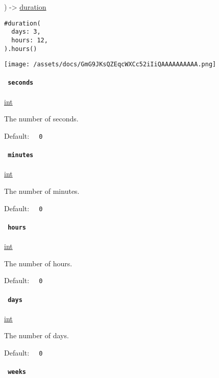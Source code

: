 ) -\textgreater{} \href{/docs/reference/foundations/duration/}{duration}

\begin{verbatim}
#duration(
  days: 3,
  hours: 12,
).hours()
\end{verbatim}

\texttt{[image: /assets/docs/GmG9JKsQZEqcWXCc52iIiQAAAAAAAAAA.png]}

\paragraph{\texorpdfstring{\texttt{\ seconds\ }}{ seconds }}\label{constructor-seconds}

\href{/docs/reference/foundations/int/}{int}

The number of seconds.

Default: \texttt{\ }{\texttt{\ 0\ }}\texttt{\ }

\paragraph{\texorpdfstring{\texttt{\ minutes\ }}{ minutes }}\label{constructor-minutes}

\href{/docs/reference/foundations/int/}{int}

The number of minutes.

Default: \texttt{\ }{\texttt{\ 0\ }}\texttt{\ }

\paragraph{\texorpdfstring{\texttt{\ hours\ }}{ hours }}\label{constructor-hours}

\href{/docs/reference/foundations/int/}{int}

The number of hours.

Default: \texttt{\ }{\texttt{\ 0\ }}\texttt{\ }

\paragraph{\texorpdfstring{\texttt{\ days\ }}{ days }}\label{constructor-days}

\href{/docs/reference/foundations/int/}{int}

The number of days.

Default: \texttt{\ }{\texttt{\ 0\ }}\texttt{\ }

\paragraph{\texorpdfstring{\texttt{\ weeks\ }}{ weeks }}\label{constructor-weeks}

